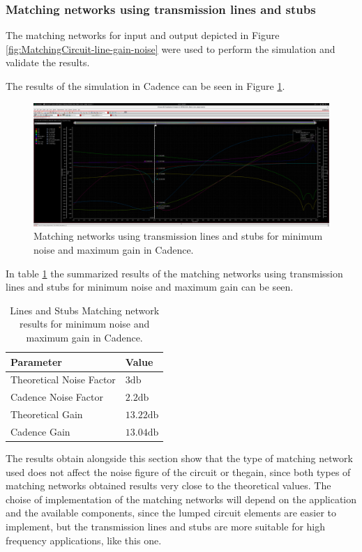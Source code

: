 \subsubsection{Matching networks using transmission lines and stubs}

The matching networks for input and output depicted in Figure \ref{fig:MatchingCircuit-line-gain-noise} were used to perform the simulation and validate the results.

The results of the simulation in Cadence can be seen in Figure \ref{fig:CadenceNoiseGainMatchingCircuitLine}.

\begin{figure}[H]
    \centering
    \includegraphics[width=1\textwidth]{Images/CAD-LinesmatchNoiseGain.png}
    \caption{Matching networks using transmission lines and stubs for minimum noise and maximum gain in Cadence.}
    \label{fig:CadenceNoiseGainMatchingCircuitLine}
\end{figure}

In table \ref{tab:NoiseGainMatchingParametersLine} the summarized results of the matching networks using transmission lines and stubs for minimum noise and maximum gain can be seen.
\begin{table}[H]
    \centering
    \caption{Lines and Stubs Matching network results for minimum noise and maximum gain in Cadence.}
    \begin{tabularx}{\textwidth}{>{\centering\arraybackslash}X >{\centering\arraybackslash}X}
        \toprule
        \textbf{Parameter} & \textbf{Value} \\
        \midrule
        Theoretical Noise Factor  & $3 \si{\decibel}$ \\
        \midrule
        Cadence Noise Factor & $2.2 \si{\decibel}$ \\
        \midrule
        Theoretical Gain & $13.22 \si{\decibel}$ \\
        \midrule
        Cadence Gain & $13.04 \si{\decibel}$ \\
        \bottomrule
    \end{tabularx}
    \label{tab:NoiseGainMatchingParametersLine}
\end{table}

The results obtain alongside this section show that the type of matching network used does not affect the noise figure of the circuit or thegain, since both types of matching networks obtained results very close to the theoretical values. The choise of implementation of the matching networks will depend on the application and the available components, since the lumped circuit elements are easier to implement, but the transmission lines and stubs are more suitable for high frequency applications, like this one.